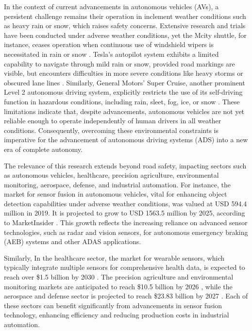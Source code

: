 \documentclass[report.tex]{subfiles}
\begin{document}
        In the context of current advancements in autonomous vehicles (AVs), a persistent challenge remains their operation in inclement weather conditions such as heavy rain or snow, which raises safety concerns. Extensive research and trials have been conducted under adverse weather conditions, yet the Mcity shuttle, for instance, ceases operation when continuous use of windshield wipers is necessitated in rain or snow \cite{briefs2015mcity}. Tesla's autopilot system exhibits a limited capability to navigate through mild rain or snow, provided road markings are visible, but encounters difficulties in more severe conditions like heavy storms or obscured lane lines \cite{Lambert2019}. Similarly, General Motors' Super Cruise, another prominent Level 2 autonomous driving system, explicitly restricts the use of its self-driving function in hazardous conditions, including rain, sleet, fog, ice, or snow \cite{cadillac2021supercruise}. These limitations indicate that, despite advancements, autonomous vehicles are not yet reliable enough to operate independently of human drivers in all weather conditions. Consequently, overcoming these environmental constraints is imperative for the advancement of autonomous driving systems (ADS) into a new era of complete autonomy.
        
        The relevance of this research extends beyond road safety, impacting sectors such as autonomous vehicles, healthcare, precision agriculture, environmental monitoring, aerospace, defense, and industrial automation. For instance, the market for sensor fusion in autonomous vehicles, vital for enhancing object detection capabilities under adverse weather conditions, was valued at USD 594.4 million in 2019. It is projected to grow to USD 1563.5 million by 2025, according to MarketInsider \cite{marketInsider}. This growth reflects the increasing reliance on advanced sensor technologies, such as radar and vision sensors, for autonomous emergency braking (AEB) systems and other ADAS applications.
        
        Similarly, In the healthcare sector, the market for wearable sensors, which typically integrate multiple sensors for comprehensive health data, is expected to reach over \$1.5 billion by 2030 \cite{straitsresearch2021}. The precision agriculture and environmental monitoring markets are anticipated to reach \$10.5 billion by 2026 \cite{mordorintelligence2023}, while the aerospace and defense sector is projected to reach \$23.83 billion by 2027 \cite{fortunebusinessinsights2023}. Each of these sectors can benefit significantly from advancements in sensor fusion technology, enhancing efficiency and reducing production costs in industrial automation.
        
\end{document}
